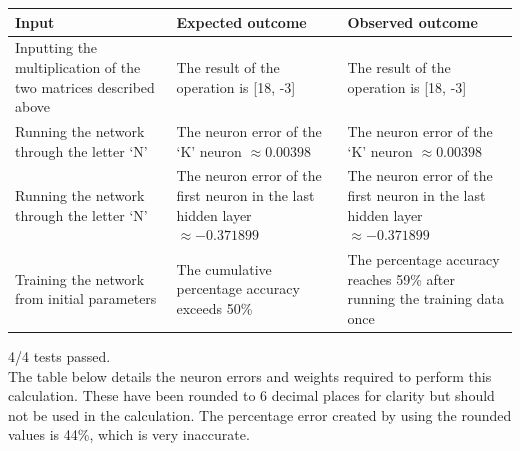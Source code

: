 \documentclass{article}
\begin{document}
\begin{enumerate}
    \begin{table}[H]
        \centering
        \begin{tabularx}{\textwidth}{|L|L|L|}
            \hline
            \textbf{Input} & \textbf{Expected outcome} & \textbf{Observed outcome} \\\hline
            Inputting the multiplication of the two matrices described above & The result of the operation is [18, -3] & The result of the operation is [18, -3] \\\hline
			Running the network through the letter `N' & The neuron error of the `K' neuron \(\approx 0.00398\) & The neuron error of the `K' neuron \(\approx 0.00398\) \\\hline
            Running the network through the letter `N' & The neuron error of the first neuron in the last hidden layer \(\approx -0.371899\) & The neuron error of the first neuron in the last hidden layer \(\approx -0.371899\) \\\hline
            Training the network from initial parameters & The cumulative percentage accuracy exceeds 50\% & The percentage accuracy reaches 59\% after running the training data once \\\hline
        \end{tabularx}
    \end{table}

    4/4 tests passed. \\

    The table below details the neuron errors and weights required to perform this calculation. These have been rounded to 6 decimal places for clarity but should not be used in the calculation. The percentage error created by using the rounded values is 44\%, which is very inaccurate.


\end{enumerate}
\end{document}
